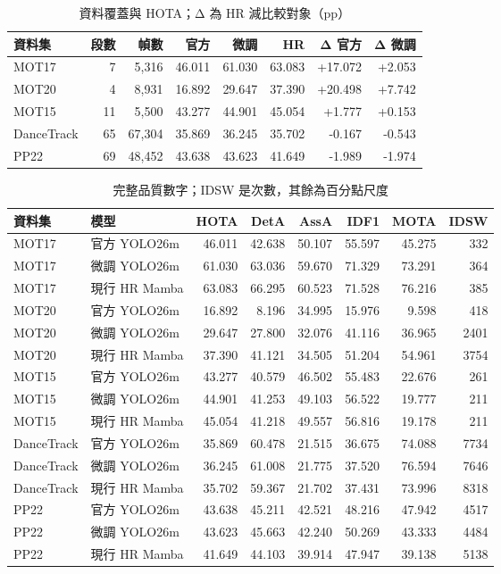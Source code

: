 \begin{table}[H]
\caption{資料覆蓋與 HOTA；Δ 為 HR 減比較對象（pp）}
\small
\noindent\begin{tabularx}{\textwidth}{@{}Yrrrrrrr@{}}
\toprule
資料集 & 段數 & 幀數 & 官方 & 微調 & HR & Δ 官方 & Δ 微調 \\
\midrule
MOT17 & 7 & 5,316 & 46.011 & 61.030 & 63.083 & +17.072 & +2.053 \\
MOT20 & 4 & 8,931 & 16.892 & 29.647 & 37.390 & +20.498 & +7.742 \\
MOT15 & 11 & 5,500 & 43.277 & 44.901 & 45.054 & +1.777 & +0.153 \\
DanceTrack & 65 & 67,304 & 35.869 & 36.245 & 35.702 & -0.167 & -0.543 \\
PP22 & 69 & 48,452 & 43.638 & 43.623 & 41.649 & -1.989 & -1.974 \\
\bottomrule
\end{tabularx}
\end{table}
\begin{table}[H]
\caption{完整品質數字；IDSW 是次數，其餘為百分點尺度}
\small
\noindent\begin{tabularx}{\textwidth}{@{}P{22mm}Yrrrrrr@{}}
\toprule
資料集 & 模型 & HOTA & DetA & AssA & IDF1 & MOTA & IDSW \\
\midrule
MOT17 & 官方 YOLO26m & 46.011 & 42.638 & 50.107 & 55.597 & 45.275 & 332 \\
MOT17 & 微調 YOLO26m & 61.030 & 63.036 & 59.670 & 71.329 & 73.291 & 364 \\
MOT17 & 現行 HR Mamba & 63.083 & 66.295 & 60.523 & 71.528 & 76.216 & 385 \\
MOT20 & 官方 YOLO26m & 16.892 & 8.196 & 34.995 & 15.976 & 9.598 & 418 \\
MOT20 & 微調 YOLO26m & 29.647 & 27.800 & 32.076 & 41.116 & 36.965 & 2401 \\
MOT20 & 現行 HR Mamba & 37.390 & 41.121 & 34.505 & 51.204 & 54.961 & 3754 \\
MOT15 & 官方 YOLO26m & 43.277 & 40.579 & 46.502 & 55.483 & 22.676 & 261 \\
MOT15 & 微調 YOLO26m & 44.901 & 41.253 & 49.103 & 56.522 & 19.777 & 211 \\
MOT15 & 現行 HR Mamba & 45.054 & 41.218 & 49.557 & 56.816 & 19.178 & 211 \\
DanceTrack & 官方 YOLO26m & 35.869 & 60.478 & 21.515 & 36.675 & 74.088 & 7734 \\
DanceTrack & 微調 YOLO26m & 36.245 & 61.008 & 21.775 & 37.520 & 76.594 & 7646 \\
DanceTrack & 現行 HR Mamba & 35.702 & 59.367 & 21.702 & 37.431 & 73.996 & 8318 \\
PP22 & 官方 YOLO26m & 43.638 & 45.211 & 42.521 & 48.216 & 47.942 & 4517 \\
PP22 & 微調 YOLO26m & 43.623 & 45.663 & 42.240 & 50.269 & 43.333 & 4484 \\
PP22 & 現行 HR Mamba & 41.649 & 44.103 & 39.914 & 47.947 & 39.138 & 5138 \\
\bottomrule
\end{tabularx}
\end{table}
